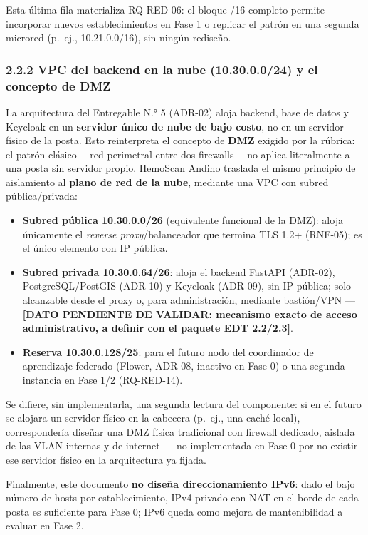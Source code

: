 \documentclass[11pt,a4paper]{article}
\providecommand{\tightlist}{%
  \setlength{\itemsep}{0pt}\setlength{\parskip}{0pt}}
\begin{document}
Esta última fila materializa RQ-RED-06: el bloque /16 completo permite incorporar nuevos establecimientos en Fase 1 o replicar el patrón en una segunda microred (p.~ej., 10.21.0.0/16), sin ningún rediseño.

\subsubsection{2.2.2 VPC del backend en la nube (10.30.0.0/24) y el concepto de DMZ}\label{vpc-del-backend-en-la-nube-10.30.0.024-y-el-concepto-de-dmz}

La arquitectura del Entregable N.° 5 (ADR-02) aloja backend, base de datos y Keycloak en un \textbf{servidor único de nube de bajo costo}, no en un servidor físico de la posta. Esto reinterpreta el concepto de \textbf{DMZ} exigido por la rúbrica: el patrón clásico ---red perimetral entre dos firewalls--- no aplica literalmente a una posta sin servidor propio. HemoScan Andino traslada el mismo principio de aislamiento al \textbf{plano de red de la nube}, mediante una VPC con subred pública/privada:

\begin{itemize}
\tightlist
\item
  \textbf{Subred pública 10.30.0.0/26} (equivalente funcional de la DMZ): aloja únicamente el \emph{reverse proxy}/balanceador que termina TLS 1.2+ (RNF-05); es el único elemento con IP pública.
\item
  \textbf{Subred privada 10.30.0.64/26}: aloja el backend FastAPI (ADR-02), PostgreSQL/PostGIS (ADR-10) y Keycloak (ADR-09), sin IP pública; solo alcanzable desde el proxy o, para administración, mediante bastión/VPN --- \textbf{{[}DATO PENDIENTE DE VALIDAR: mecanismo exacto de acceso administrativo, a definir con el paquete EDT 2.2/2.3{]}}.
\item
  \textbf{Reserva 10.30.0.128/25}: para el futuro nodo del coordinador de aprendizaje federado (Flower, ADR-08, inactivo en Fase 0) o una segunda instancia en Fase 1/2 (RQ-RED-14).
\end{itemize}

Se difiere, sin implementarla, una segunda lectura del componente: si en el futuro se alojara un servidor físico en la cabecera (p.~ej., una caché local), correspondería diseñar una DMZ física tradicional con firewall dedicado, aislada de las VLAN internas y de internet --- no implementada en Fase 0 por no existir ese servidor físico en la arquitectura ya fijada.

Finalmente, este documento \textbf{no diseña direccionamiento IPv6}: dado el bajo número de hosts por establecimiento, IPv4 privado con NAT en el borde de cada posta es suficiente para Fase 0; IPv6 queda como mejora de mantenibilidad a evaluar en Fase 2.
\end{document}
